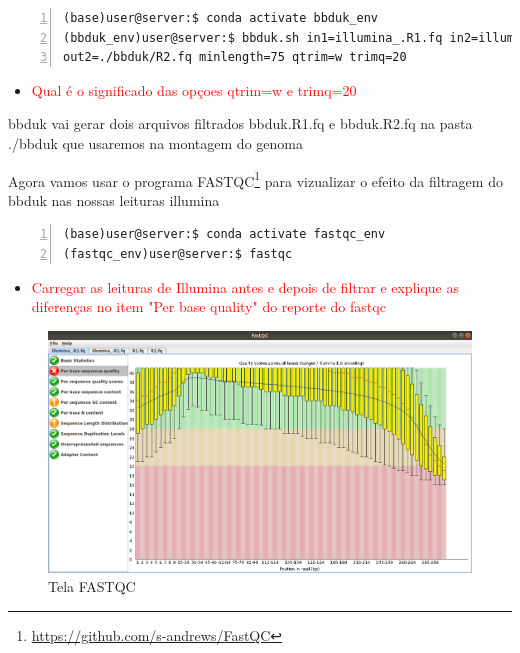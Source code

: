 \documentclass[letter,11pt]{book}
\begin{document}
\begin{Verbatim}[commandchars=!\{\}, numbers=left,label= Limpando leituras Illumina com bbduk,frame=topline,fontsize=\scriptsize]
(base)user@server:$ conda activate bbduk_env
(bbduk_env)user@server:$ bbduk.sh in1=illumina_.R1.fq in2=illumina_.R2.fq out1=./bbduk/R1.fq \
out2=./bbduk/R2.fq minlength=75 qtrim=w trimq=20
\end{Verbatim}


\begin{itemize}
\item \textcolor{red}{Qual é o significado das opçoes qtrim=w e trimq=20}
\end{itemize}


bbduk vai gerar dois arquivos filtrados bbduk.R1.fq e bbduk.R2.fq na pasta ./bbduk que usaremos na montagem do genoma

Agora vamos usar o programa FASTQC\footnote{\url{https://github.com/s-andrews/FastQC}} para vizualizar o efeito da filtragem do bbduk nas nossas leituras illumina

\begin{Verbatim}[commandchars=!\{\}, numbers=left,label= Abrindo o FASTQC,frame=topline,fontsize=\scriptsize]
(base)user@server:$ conda activate fastqc_env 
(fastqc_env)user@server:$ fastqc
\end{Verbatim}

\begin{itemize}
\item \textcolor{red}{Carregar as leituras de Illumina antes e depois de filtrar e explique as diferenças no item "Per base quality" do reporte do fastqc}
\end{itemize}

\begin{figure}[h!]
\centering
 \includegraphics[width=12cm]{Figs/fastqc.png}
 \caption{\label{fig:fastqc}Tela FASTQC}
\end{figure}
\end{document}
